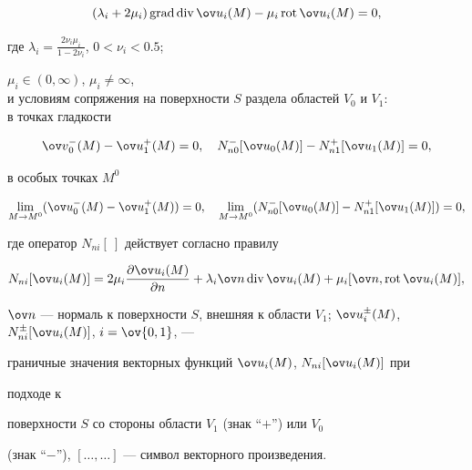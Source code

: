 \begin{equation} 


(\lambda_i+2\mu_i)\Grad\Div\ov u_i(M)-\mu_i\Rot\ov u_i(M)=0, 


\end{equation} 


где $\lambda_i=\frac{2\nu_i\mu_i}{1-2\nu_i}$, $0<\nu_i<0.5$; 


$\mu_i\in(0,\infty)$, $\mu_i\ne\infty$, \\ 


и условиям сопряжения на поверхности $S$ раздела областей $V_0$ и $V_1$: \\ 


в точках гладкости 


\begin{equation} 


\ov v{}^-_0(M)-\ov u{}^+_1(M)=0,\quad 


N^-_{n0}[\ov u_0(M)]-N^+_{n1}[\ov u_1(M)]=0, 


\end{equation} 


в особых точках $M^0$ 


\begin{equation} 


\lim_{M\to M^0}(\ov u{}^-_0(M)-\ov u{}^+_1(M))=0,\quad 


\lim_{M\to M^0}(N^-_{n0}[\ov u_0(M)]- 


N^+_{n1}[\ov u_1(M)])=0, 


\end{equation} 


где оператор $N_{ni}[\ ]$ действует согласно правилу 


$$ 


N_{ni}[\ov u_i(M)]=2\mu_i\frac{\partial\ov u_i(M)}{\partial n} 


+\lambda_i\ov n\Div\ov u_i(M)+\mu_i[\ov n,\Rot\ov u_i(M)], 


$$ 


$\ov n$ --- нормаль к поверхности $S$, внешняя к области $V_1$; $\ov 


u{}^{\pm}_i(M)$, $N^\pm_{ni}[\ov u_i(M)]$, $i=\ov{0,1}$, ---  


граничные значения векторных функций $\ov u_i(M)$, $N_{ni}[\ov u_i(M)]$ при 


подходе к  


поверхности $S$ со стороны области $V_1$ (знак ``$+$'') или $V_0$ 


(знак ``$-$''), $[\dotsc,\dotsc]$ --- символ векторного произведения. 


